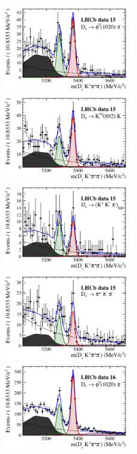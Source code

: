 \begin{figure}[h]
\includegraphics[height=!,width=0.5\textwidth]{figs/signal_y15_phipi.pdf}
\includegraphics[height=!,width=0.5\textwidth]{figs/signal_y15_KsK.pdf}
\includegraphics[height=!,width=0.5\textwidth]{figs/signal_y15_KKpi_NR.pdf}
\includegraphics[height=!,width=0.5\textwidth]{figs/signal_y15_pipipi.pdf}
\includegraphics[height=!,width=0.5\textwidth]{figs/signal_y16_phipi.pdf}

\end{figure}
